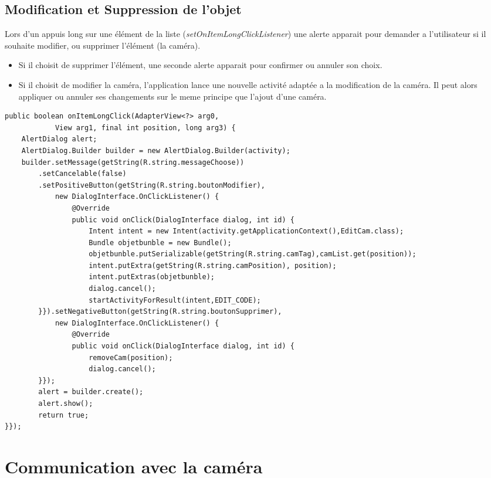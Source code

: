 \subsection{Modification et Suppression de l'objet}
Lors d'un appuis long sur une élément de la liste
(\textit{setOnItemLongClickListener}) une alerte apparait pour demander a
l'utilisateur si il souhaite modifier, ou supprimer l'élément (la caméra).
\begin{itemize}
  \item Si il choisit de supprimer l'élément, une seconde alerte apparait pour confirmer
ou annuler son choix. 
\item Si il choisit de modifier la caméra, l'application lance une nouvelle
activité adaptée a la modification de la caméra. Il peut alors appliquer ou
annuler ses changements sur le meme principe que l'ajout d'une caméra.
\end{itemize}
\newpage
\begin{changemargin}{-1cm}{-1.5cm}
\begin{lstlisting}[caption={Gestion d'un appui long sur un élément de la
liste.}]
public boolean onItemLongClick(AdapterView<?> arg0, 
			View arg1, final int position, long arg3) { 
	AlertDialog alert; 
	AlertDialog.Builder builder = new AlertDialog.Builder(activity);
	builder.setMessage(getString(R.string.messageChoose))
		.setCancelable(false)
		.setPositiveButton(getString(R.string.boutonModifier),
			new DialogInterface.OnClickListener() {
				@Override
				public void onClick(DialogInterface dialog, int id) {
					Intent intent = new Intent(activity.getApplicationContext(),EditCam.class); 
					Bundle objetbunble = new Bundle();
					objetbunble.putSerializable(getString(R.string.camTag),camList.get(position));
					intent.putExtra(getString(R.string.camPosition), position);
					intent.putExtras(objetbunble);
					dialog.cancel();
					startActivityForResult(intent,EDIT_CODE);
		}}).setNegativeButton(getString(R.string.boutonSupprimer),
			new DialogInterface.OnClickListener() {
				@Override
				public void onClick(DialogInterface dialog, int id) {
					removeCam(position);
					dialog.cancel();
		}});
		alert = builder.create();
		alert.show();
		return true;
}});
\end{lstlisting}
\end{changemargin}


\section{Communication avec la caméra}


